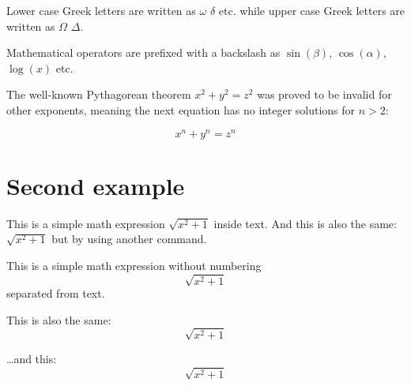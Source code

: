 \documentclass{article}
\begin{document}
Lower case Greek letters are written as $\omega$ $\delta$ etc. while upper case Greek letters are written as $\Omega$ $\Delta$.

Mathematical operators are prefixed with a backslash as $\sin(\beta)$, $\cos(\alpha)$, $\log(x)$ etc.


The well-known Pythagorean theorem \(x^2 + y^2 = z^2\) was proved to be invalid for other exponents, meaning the next equation has no integer solutions for \(n>2\):

\[ x^n + y^n = z^n \]

\section{Second example}

This is a simple math expression \(\sqrt{x^2+1}\) inside text. 
And this is also the same: 
\begin{math}
\sqrt{x^2+1}
\end{math}
but by using another command.

This is a simple math expression without numbering
\[\sqrt{x^2+1}\] 
separated from text.

This is also the same:
\begin{displaymath}
\sqrt{x^2+1}
\end{displaymath}

\ldots and this:
\begin{equation*}
\sqrt{x^2+1}
\end{equation*}
\end{document}
